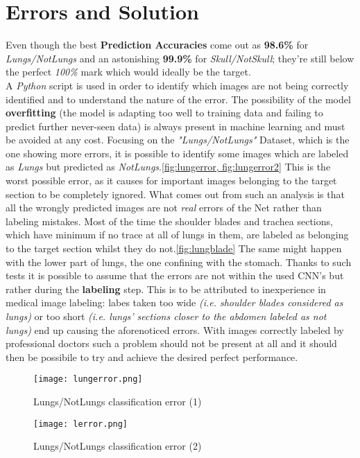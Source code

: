 \documentclass[../main.tex]{subfiles}
\begin{document}
\section{Errors and Solution}
Even though the best \textbf{Prediction Accuracies} come out as \textbf{98.6\%} for \textit{Lungs/NotLungs} and an astonishing \textbf{99.9\%} for \textit{Skull/NotSkull}; they're still below the perfect \textit{100\%} mark which would ideally be the target. \\
A \textit{Python} script is used in order to identify which images are not being correctly identified and to understand the nature of the error. The possibility of the model \textbf{overfitting} (the model is adapting too well to training data and failing to predict further never-seen data\cite{overfitting}) is always present in machine learning and must be avoided at any cost. 
Focusing on the \textit{"Lungs/NotLungs"} Dataset, which is the one showing more errors, it is possible to identify some images which are labeled as \textit{Lungs} but predicted as \textit{NotLungs}.\ref{fig:lungerror, fig:lungerror2} This is the worst possible error, as it causes for important images belonging to the target section to be completely ignored. What comes out from such an analysis is that all the wrongly predicted images are not \textit{real} errors of the Net rather than labeling mistakes. Most of the time the shoulder blades and trachea sections, which have minimum if no trace at all of lungs in them, are labeled as belonging to the target section whilst they do not.\ref{fig:lungblade} The same might happen with the lower part of lungs, the one confining with the stomach. Thanks to such tests it is possible to assume that the errors are not within the used CNN's but rather during the \textbf{labeling} step. This is to be attributed to inexperience in medical image labeling: labes taken too wide \textit{(i.e. shoulder blades considered as lungs)} or too short \textit{(i.e. lungs' sections closer to the abdomen labeled as not lungs)} end up causing the aforenoticed errors. With images correctly labeled by professional doctors such a problem should not be present at all and it should then be possibile to try and achieve the desired perfect performance.

\begin{figure}[h!b]
	\centering
	\texttt{[image: lungerror.png]}
	\caption{Lungs/NotLungs classification error (1)}
	\label{fig:lungerror}
\end{figure}

\begin{figure}[h!b]
	\centering
	\texttt{[image: lerror.png]}
	\caption{Lungs/NotLungs classification error (2)}
	\label{fig:lungerror2}
\end{figure}
\end{document}
